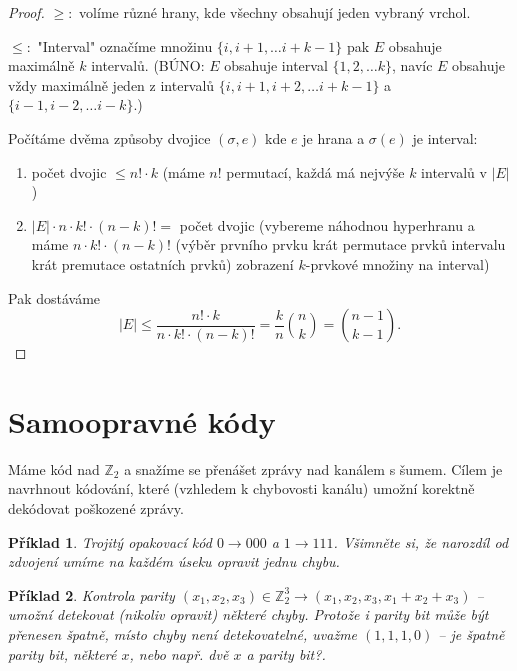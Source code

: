 \documentclass[a4paper,10pt,titlepage]{article} \usepackage[utf8]{inputenc}
\newtheorem*{example}{Příklad}
\begin{document}
\begin{proof}
$\geq :$ volíme různé hrany, kde všechny obsahují jeden vybraný vrchol.

$\leq :$ "Interval" označíme množinu $\{i,i+1,\ldots i+k-1\}$ pak $E$ obsahuje maximálně $k$ intervalů.
(BÚNO: $E$ obsahuje interval $\{1,2,\ldots k\}$, navíc $E$ obsahuje vždy maximálně jeden z intervalů 
$\{i,i+1,i+2,\ldots i+k-1\}$ a $\{i-1,i-2,\ldots i-k\}$.)

Počítáme dvěma způsoby dvojice $(\sigma,e)$ kde $e$ je hrana a $\sigma(e)$ je interval:
\begin{enumerate}
\item počet dvojic $\leq n! \cdot k$ (máme $n!$ permutací, každá má nejvýše $k$ intervalů v $|E|$)
\item $|E| \cdot n \cdot k! \cdot (n-k)! = $ počet dvojic
	(vybereme náhodnou hyperhranu a máme $n \cdot k! \cdot (n-k)!$ (výběr prvního prvku krát permutace prvků intervalu krát
	premutace ostatních prvků) zobrazení $k$-prvkové množiny na interval)
\end{enumerate}
Pak dostáváme 
\[
	|E| \leq \frac{n! \cdot k}{ n \cdot k! \cdot (n-k)!} = \frac{k}{n}\binom{n}{k} = \binom{n-1}{k-1}.
\]
\end{proof}

\medskip

\section{Samoopravné kódy}

Máme kód nad $\mathbb{Z}_2$ a snažíme se přenášet zprávy nad kanálem s šumem. Cílem je navrhnout kódování, které (vzhledem k chybovosti kanálu) umožní korektně dekódovat poškozené zprávy.

\begin{example}
Trojitý opakovací kód $0 \rightarrow 000$ a $1 \rightarrow 111$. Všimněte si, že narozdíl od zdvojení umíme na každém úseku opravit jednu chybu.
\end{example}

\begin{example}
Kontrola parity $(x_1,x_2,x_3) \in \mathbb{Z}_2^3 \rightarrow (x_1,x_2,x_3,x_1+x_2+x_3)$ -- umožní detekovat (nikoliv opravit) některé chyby. Protože i parity bit může být přenesen špatně, místo chyby není detekovatelné, uvažme $(1, 1, 1, 0)$ -- je špatně parity bit, některé $x$, nebo např. dvě $x$ a parity bit?.
\end{example}
\end{document}
